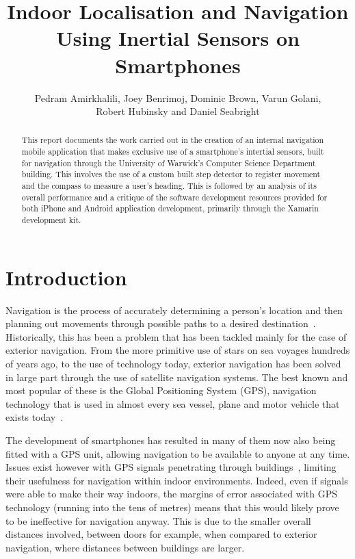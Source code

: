\documentclass[12pt,a4paper]{report}
\title{Indoor Localisation and Navigation Using Inertial Sensors on Smartphones}
\author{Pedram Amirkhalili, Joey Benrimoj,  Dominic Brown, Varun Golani, \\Robert Hubinsky and Daniel Seabright  }
\date{}
\begin{document}
\maketitle

\tableofcontents

\pagebreak

\begin{abstract}
This report documents the work carried out in the creation of an internal navigation mobile application that makes exclusive use of a smartphone's intertial sensors, built for navigation through the University of Warwick's Computer Science Department building. This involves the use of a custom built step detector to register movement and the compass to measure a user's heading. This is followed by an analysis of its overall performance and a critique of the software development resources provided for both iPhone and Android application development, primarily through the Xamarin development kit.
\end{abstract}

\chapter{Introduction}

Navigation is the process of accurately determining a person's location and then planning out movements through possible paths to a desired destination~\cite{navMeaning}. Historically, this has been a problem that has been tackled mainly for the case of exterior navigation. From the more primitive use of stars on sea voyages hundreds of years ago, to the use of technology today, exterior navigation has been solved in large part through the use of satellite navigation systems. The best known and most popular of these is the Global Positioning System (GPS), navigation technology that is used in almost every sea vessel, plane and motor vehicle that exists today~\cite{gps}.

The development of smartphones has resulted in many of them now also being fitted with a GPS unit, allowing navigation to be available to anyone at any time. Issues exist however with GPS signals penetrating through buildings~\cite{gps}, limiting their usefulness for navigation within indoor environments. Indeed, even if signals were able to make their way indoors, the margins of error associated with GPS technology (running into the tens of metres) means that this would likely prove to be ineffective for navigation anyway. This is due to the smaller overall distances involved, between doors for example, when compared to exterior navigation, where distances between buildings are larger.
\end{document}
